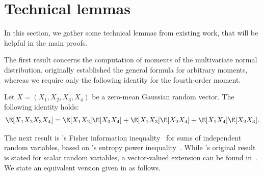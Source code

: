 \documentclass[11pt]{article}
\begin{document}
\newpage

\appendix

\section{Technical lemmas} \label{proof:technical}

In this section, we gather some technical lemmas from existing work, that will be helpful in the main proofs.

The first result concerns the computation of moments of the multivariate normal distribution. \citeauthor{isserlis1918formula} originally established the general formula for arbitrary moments, whereas we require only the following identity for the fourth-order moment.
\begin{lemma} \label{lem:isserlis}
    Let $X=(X_1,X_2,X_3,X_4)$ be a zero-mean Gaussian random vector. The following identity holds:
    \begin{align*}
        \E[X_1X_2X_3X_4] = \E[X_1 X_2] \E[X_3 X_4]+\E[X_1 X_3] \E[X_2 X_4]+\E[X_1 X_4] \E[X_2 X_3] .
    \end{align*}
\end{lemma}

The next result is \citeauthor{stam1959some}'s Fisher information inequality~\citep{stam1959some} for sums of independent random variables, based on \citeauthor{shannon1948mathematical}'s entropy power inequality~\citep{shannon1948mathematical}. While \citeauthor{stam1959some}'s original result is stated for scalar random variables, a vector-valued extension can be found in~\cite[Thm.~13]{dembo2002information}. We state an equivalent version given 
in \cite[Eq.~(37)]{dembo2002information} as follows.
\end{document}
